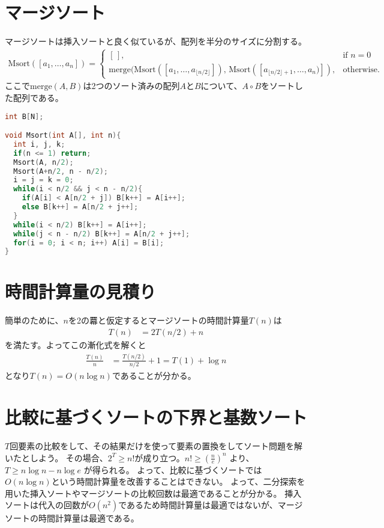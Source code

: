 \documentclass[a4paper,twoside,onecolumn,openany,article,10pt]{memoir}
\theoremstyle{remark}
\begin{document}
\section{マージソート}
マージソートは挿入ソートと良く似ているが、配列を半分のサイズに分割する。
\begin{align*}
\mathrm{Msort}([a_1,\dotsc,a_n]) =
\begin{cases}
[\,],& \text{if } n = 0\\
\mathrm{merge}(\mathrm{Msort}([a_1,\dotsc,a_{\lfloor n/2\rfloor}]),\, \mathrm{Msort}([a_{\lfloor n/2\rfloor+1}, \dotsc,a_n)]),& \text{otherwise.}
\end{cases}
\end{align*}
ここで$\mathrm{merge}(A, B)$は2つのソート済みの配列$A$と$B$について、$A\circ B$をソートした配列である。
\begin{lstlisting}[basicstyle=\ttfamily\normalsize,showstringspaces=false,language=C,frame=single]
int B[N];

void Msort(int A[], int n){
  int i, j, k;
  if(n <= 1) return;
  Msort(A, n/2);
  Msort(A+n/2, n - n/2);
  i = j = k = 0;
  while(i < n/2 && j < n - n/2){
    if(A[i] < A[n/2 + j]) B[k++] = A[i++];
    else B[k++] = A[n/2 + j++];
  }
  while(i < n/2) B[k++] = A[i++];
  while(j < n - n/2) B[k++] = A[n/2 + j++];
  for(i = 0; i < n; i++) A[i] = B[i];
}
\end{lstlisting}

\section{時間計算量の見積り}
簡単のために、$n$を2の羃と仮定するとマージソートの時間計算量$T(n)$は
\begin{align*}
T(n) &= 2 T(n/2) + n
\end{align*}
を満たす。よってこの漸化式を解くと
\begin{align*}
\frac{T(n)}n &= \frac{T(n/2)}{n/2} + 1 = T(1) + \log n
\end{align*}
となり$T(n) = O(n\log n)$であることが分かる。


\section{比較に基づくソートの下界と基数ソート}
$T$回要素の比較をして、その結果だけを使って要素の置換をしてソート問題を解いたとしよう。
その場合、$2^T \ge n!$が成り立つ。$n! \ge \left(\frac{n}{e}\right)^n$ より、$T\ge n\log n - n \log e$ が得られる。
よって、比較に基づくソートでは$O(n\log n)$という時間計算量を改善することはできない。
よって、二分探索を用いた挿入ソートやマージソートの比較回数は最適であることが分かる。
挿入ソートは代入の回数が$O(n^2)$であるため時間計算量は最適ではないが、マージソートの時間計算量は最適である。
\end{document}
